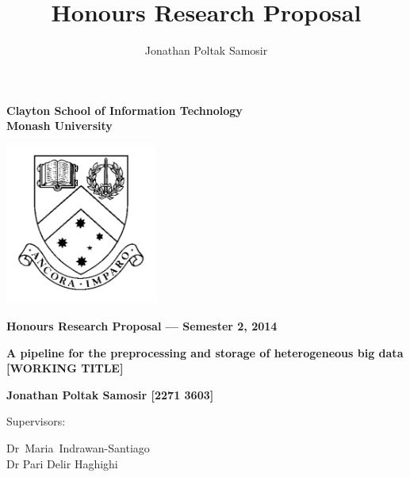 \documentclass[a4paper,11pt]{article}
\author{Jonathan Poltak Samosir}
\title{Honours Research Proposal}
\begin{document}
\thispagestyle{empty} %
\renewcommand{\thepage}{\roman{page}}

\begin{spacing}{1.5}
\begin{center}
{\Large \bfseries
Clayton School of Information Technology\\
Monash University}

\vspace*{30mm}

\includegraphics[width=5cm]{img/MonashCrest.pdf}

\vspace*{15mm}

{\large \bfseries
Honours Research Proposal --- Semester 2, 2014
}

\vspace*{10mm}

{\LARGE \bfseries
A pipeline for the preprocessing and storage of heterogeneous big data [WORKING TITLE]
}

\vspace*{20mm}

{\large \bfseries
Jonathan Poltak Samosir [2271 3603]

\vspace*{20mm}

Supervisors: \parbox[t]{50mm}{\mbox{Dr Maria Indrawan-Santiago}\\Dr Pari Delir Haghighi}
}

\end{center}
\end{spacing}

\newpage

\tableofcontents

\newpage
\setcounter{page}{1}
\renewcommand{\thepage}{\arabic{page}}
\end{document}
